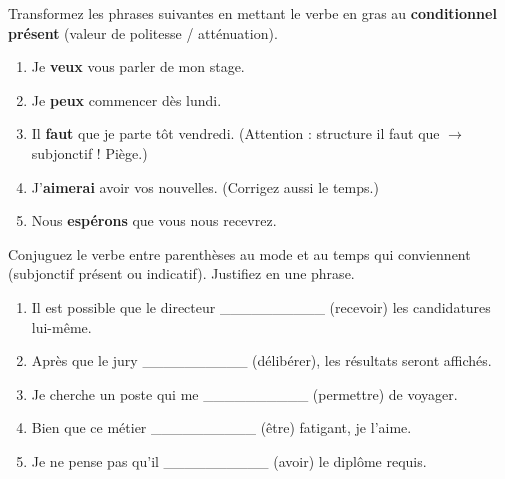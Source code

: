 \documentclass[11pt]{article}
\begin{document}
\begin{exercice}
Transformez les phrases suivantes en mettant le verbe en gras au \textbf{conditionnel présent} (valeur de politesse / atténuation).
\begin{enumerate}
    \item Je \textbf{veux} vous parler de mon stage.
    \item Je \textbf{peux} commencer dès lundi.
    \item Il \textbf{faut} que je parte tôt vendredi. (Attention : structure \og il faut que \fg{} $\rightarrow$ subjonctif ! Piège.)
    \item J'\textbf{aimerai} avoir vos nouvelles. (Corrigez aussi le temps.)
    \item Nous \textbf{espérons} que vous nous recevrez.
\end{enumerate}
\end{exercice}

\begin{exercice}
Conjuguez le verbe entre parenthèses au mode et au temps qui conviennent (subjonctif présent ou indicatif). Justifiez en une phrase.
\begin{enumerate}
    \item Il est possible que le directeur \_\_\_\_\_\_\_\_\_\_ (recevoir) les candidatures lui-même.
    \item Après que le jury \_\_\_\_\_\_\_\_\_\_ (délibérer), les résultats seront affichés.
    \item Je cherche un poste qui me \_\_\_\_\_\_\_\_\_\_ (permettre) de voyager.
    \item Bien que ce métier \_\_\_\_\_\_\_\_\_\_ (être) fatigant, je l'aime.
    \item Je ne pense pas qu'il \_\_\_\_\_\_\_\_\_\_ (avoir) le diplôme requis.
\end{enumerate}
\end{exercice}
\end{document}
